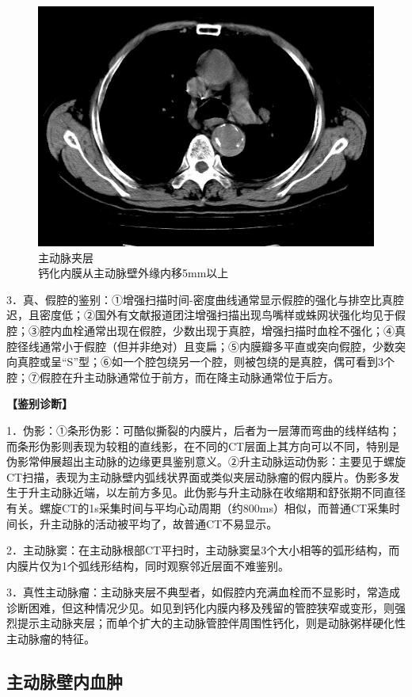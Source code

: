 \begin{figure}[!htbp]
 \centering
 \includegraphics[width=.7\textwidth,height=\textheight,keepaspectratio]{./images/Image00264.jpg}
 \captionsetup{justification=centering}
 \caption{主动脉夹层\\{\small 钙化内膜从主动脉壁外缘内移5mm以上}}
 \label{fig10-5}
  \end{figure} 

3．真、假腔的鉴别：①增强扫描时间-密度曲线通常显示假腔的强化与排空比真腔迟，且密度低；②国外有文献报道团注增强扫描出现鸟嘴样或蛛网状强化均见于假腔；③腔内血栓通常出现在假腔，少数出现于真腔，增强扫描时血栓不强化；④真腔径线通常小于假腔（但并非绝对）且变扁；⑤内膜瓣多平直或突向假腔，少数突向真腔或呈“S”型；⑥如一个腔包绕另一个腔，则被包绕的是真腔，偶可看到3个腔；⑦假腔在升主动脉通常位于前方，而在降主动脉通常位于后方。

\textbf{【鉴别诊断】}

1．伪影：①条形伪影：可酷似撕裂的内膜片，后者为一层薄而弯曲的线样结构；而条形伪影则表现为较粗的直线影，在不同的CT层面上其方向可以不同，特别是伪影常伸展超出主动脉的边缘更具鉴别意义。②升主动脉运动伪影：主要见于螺旋CT扫描，表现为主动脉壁内弧线状界面或类似夹层动脉瘤的假内膜片。伪影多发生于升主动脉近端，以左前方多见。此伪影与升主动脉在收缩期和舒张期不同直径有关。螺旋CT的1s采集时间与平均心动周期（约800ms）相似，而普通CT采集时间长，升主动脉的活动被平均了，故普通CT不易显示。

2．主动脉窦：在主动脉根部CT平扫时，主动脉窦呈3个大小相等的弧形结构，而内膜片仅为1个弧线形结构，同时观察邻近层面不难鉴别。

3．真性主动脉瘤：主动脉夹层不典型者，如假腔内充满血栓而不显影时，常造成诊断困难，但这种情况少见。如见到钙化内膜内移及残留的管腔狭窄或变形，则强烈提示主动脉夹层；而单个扩大的主动脉管腔伴周围性钙化，则是动脉粥样硬化性主动脉瘤的特征。

\subsection{主动脉壁内血肿}

